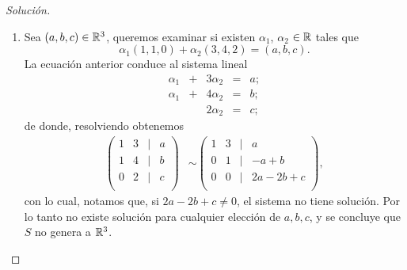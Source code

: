 \documentclass[a4,11pt]{aleph-notas}
\begin{document}
\begin{proof}[Solución]\hspace{0pt}
    \begin{enumerate}
        \item Sea $(a, b, c) \in \mathbb{R}^3$, queremos examinar si existen $\alpha_1$, $\alpha_2$ $\in \mathbb{R}$ tales que  
        \[
        \alpha_{1} (1, 1, 0) + \alpha_{2} (3, 4, 2) =(a, b, c).
        \]
        La ecuación anterior conduce al sistema lineal
        \[
        \begin{array}{rrrrrrr}
         \alpha _{1} & + & 3\alpha_{2} & = & a; \\
         \alpha _{1} & + & 4\alpha_{2} & = & b;\\
         & & 2\alpha_{2} & = & c;
         \end{array}
         \]
         de donde, resolviendo obtenemos
         \begin{align*}
        \begin{pmatrix}
            1&3&|&a\\
            1&4&|&b\\
            0&2&|&c\\
        \end{pmatrix}
        & \sim 
        \begin{pmatrix}
            1&3&|&a\\
            0&1&|&-a+b\\
            0&0&|&2a - 2b +c\\
        \end{pmatrix},
        \end{align*}
        con lo cual, notamos que, si $2a - 2b + c \neq 0$, el sistema no tiene solución. Por lo tanto no existe solución para cualquier elección de $a, b, c$, y se concluye que $S$ no genera a $\mathbb{R}^3$.
        

\end{enumerate}
\end{proof}
\end{document}
